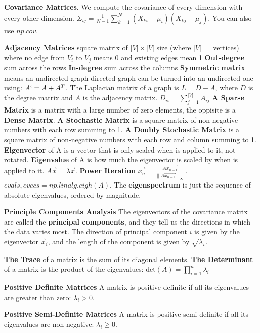 \documentclass{article}
\begin{document}
\noindent \textbf{Covariance Matrices}.
We compute the covariance of every dimension with every other dimension.
$\Sigma_{ij} = \frac{1}{N - 1} \sum_{k=1}^{N} (X_{ki} - \mu_i)(X_{kj} - \mu_j)$.
You can also use $np.cov$.



\noindent \textbf{Adjacency Matrices} square matrix of $|V| \times |V|$ size (where $|V| =$ vertices) where no edge from $V_i$ to $V_j$ means 0 and existing edges mean 1
\textbf{Out-degree} sum across the rows
\textbf{In-degree} sum across the columns
\textbf{Symmetric matrix} means an undirected graph
directed graph can be turned into an undirected one using: $A` = A + A^T$.
The Laplacian matrix of a graph is $L = D - A$, where $D$ is the degree matrix and $A$ is the adjacency matrix.
$D_{ii} = \sum_{j=1}^{|V|} A_{ij}$
\textbf{A Sparse Matrix} is a matrix with a large number of zero elements, the oppisite is a \textbf{Dense Matrix}.
\textbf{A Stochastic Matrix} is a square matrix of non-negative numbers with each row summing to 1.
\textbf{A Doubly Stochastic Matrix} is a square matrix of non-negative numbers with each row and column summing to 1.
\textbf{Eigenvector} of A is a vector that is only scaled when is applied to it, not rotated.
\textbf{Eigenvalue} of A is how much the eigenvector is scaled by when is applied to it.
$A\vec{x} = \lambda  \vec{x}$.
\textbf{Power Iteration}
$\vec{x_n} = \frac{A \vec{x_{n-1}}}{\|A\vec{x_{n-1}}\|_\infty}$.
$evals, evecs = np.linalg.eigh(A)$.
The \textbf{eigenspectrum} is just the sequence of absolute eigenvalues, ordered by magnitude.

\noindent \textbf{Principle Components Analysis}
The eigenvectors of the covariance matrix are called the \textbf{principal components}, and they tell us the
directions in which the data varies most.
The direction of principal component $i$ is given by the eigenvector $\vec{x}_i$, and the length of the
component is given by $\sqrt{\lambda_i}$.

\noindent \textbf{The Trace} of a matrix is the sum of its diagonal elements.
\textbf{The Determinant} of a matrix is the product of the eigenvalues: $\text{det}(A) = \prod_{i=1}^n \lambda_i$

\noindent \textbf{Positive Definite Matrices}
A matrix is positive definite if all its eigenvalues are greater than zero: $\lambda_i > 0$.

\noindent \textbf{Positive Semi-Definite Matrices}
A matrix is positive semi-definite if all its eigenvalues are non-negative: $\lambda_i \geq 0$.
\end{document}
